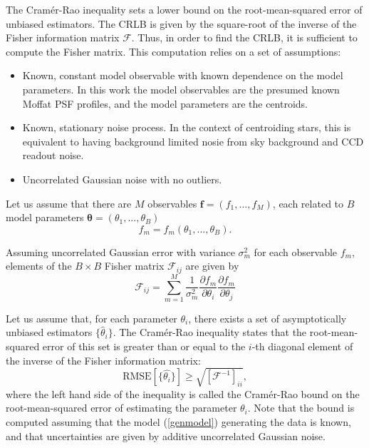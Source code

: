\documentclass[12pt, preprint]{aastex}
\newcommand{\beq}{\begin{equation}}
\newcommand{\eeq}{\end{equation}}
\begin{document}
The Cram\'{e}r-Rao inequality \citep{cramer} sets a lower bound on the 
root-mean-squared error of unbiased estimators. The CRLB is given by the square-root of the inverse of 
the Fisher information matrix $\mathcal{F}$. Thus, in order to find the CRLB,
 it is sufficient to compute the Fisher matrix. This computation relies on a set of assumptions:

\begin{itemize}
  \item Known, constant model observable with known dependence on the model parameters. 
        In this work the model observables are the presumed known Moffat PSF profiles, 
        and the model parameters are the centroids. 
  \item Known, stationary noise process. In the context of centroiding stars, this is equivalent to 
        having background limited nosie from sky background and CCD readout noise.
  \item Uncorrelated Gaussian noise with no outliers. 
\end{itemize}
 

Let us assume that there are $M$ observables $\mathbf{f} = (f_{1}, ... , f_{M})$, each
related to $B$ model parameters $\boldsymbol{\mathbf{\theta}} = (\theta_{1} , ... , \theta_{B})$ 
\beq
f_{m} = f_{m}(\theta_{1} , ... , \theta_{B}).
\label{genmodel}
\eeq

Assuming uncorrelated Gaussian error with variance $\sigma^{2}_{m}$ for each observable $f_{m}$, elements
of the $B\times B$ Fisher matrix $\mathcal{F}_{ij}$ are given by
\beq
\mathcal{F}_{ij} = \sum_{m=1}^{M}\frac{1}{\sigma_{m}^{2}}\frac{\partial f_{m}}{\partial \theta_{i}}\frac{\partial f_{m}}{\partial \theta_{j}}
\label{fisher}
\eeq

Let us assume that, for each parameter $\theta_{i}$, there exists a set of 
asymptotically unbiased estimators $\{\hat{\theta}_{i}\}$. The Cram\'{e}r-Rao inequality 
states that the root-mean-squared error of this set is greater than or equal to 
the $i$-th diagonal element of the inverse of the Fisher information matrix:
\beq
\text{RMSE}[\{\hat{\theta_{i}}\}] \geq \sqrt{[\mathcal{F}^{-1}]_{ii}},
\label{inequality}
\eeq
where the left hand side of the inequality is called the Cram\'{e}r-Rao bound on 
the root-mean-squared error of estimating the parameter $\theta_{i}$. Note that 
the bound is computed assuming that the model (\ref{genmodel}) generating the data 
is known, and that uncertainties are given by additive uncorrelated Gaussian noise.
\end{document}
